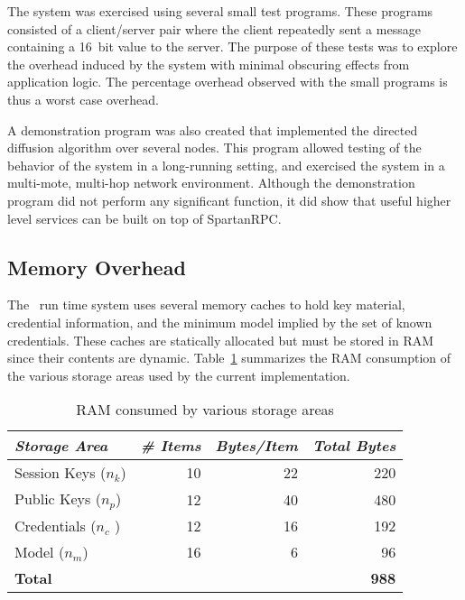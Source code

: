 The system was exercised using several small test programs. These programs consisted of a
client/server pair where the client repeatedly sent a message containing a 16~bit value to the
server. The purpose of these tests was to explore the overhead induced by the system with
minimal obscuring effects from application logic. The percentage overhead observed with the
small programs is thus a worst case overhead.

A demonstration program was also created that implemented the directed diffusion algorithm
\cite{intanagonwiwat-2003} over several nodes. This program allowed testing of the behavior of
the system in a long-running setting, and exercised the system in a multi-mote, multi-hop
network environment. Although the demonstration program did not perform any significant
function, it did show that useful higher level services can be built on top of SpartanRPC.

\subsection{Memory Overhead}
\label{section-sprocket-memory-performance}

The \Sprocket\ run time system uses several memory caches to hold key material, credential
information, and the minimum model implied by the set of known credentials. These caches are
statically allocated but must be stored in RAM since their contents are dynamic.
Table~\ref{table-ram-consumed} summarizes the RAM consumption of the various storage areas used
by the current implementation.

\begin{table}[!t]
  \newcommand\T{\rule{0pt}{2.1ex}}
  \centering
  \caption{RAM consumed by various storage areas}
  {
  \begin{tabular}{|l|r|r|r|} \hline
    \textit{Storage Area} \T & \textit{\# Items} & \textit{Bytes/Item} & \textit{Total Bytes} \\
    \hline \hline

    Session Keys ($n_k$) \T & 10 & 22 & 220 \\ \hline 
    Public Keys ($n_p$)  \T & 12 & 40 & 480 \\ \hline
    Credentials ($n_c$ ) \T & 12 & 16 & 192 \\ \hline
    Model ($n_m$)        \T & 16 &  6 &  96 \\ \hline \hline
    \textbf{Total} \T & \multicolumn{3}{r|}{ \textbf{988} } \\ \hline
  \end{tabular}
  }
  \label{table-ram-consumed}
\end{table}

